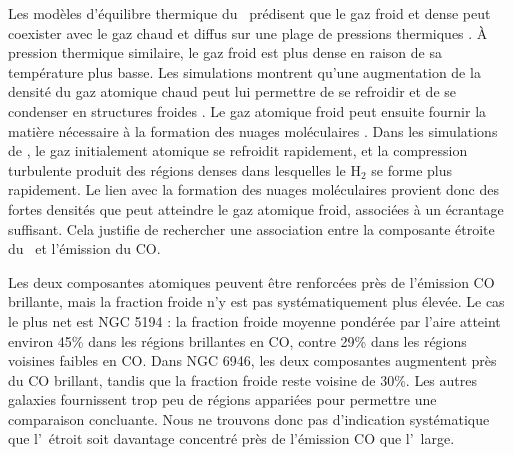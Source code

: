 Les modèles d'équilibre thermique du \HI\ prédisent que le gaz froid et dense peut coexister avec le gaz chaud et diffus sur une plage de pressions thermiques \citep{Wolfire2003}. À pression thermique similaire, le gaz froid est plus dense en raison de sa température plus basse. Les simulations montrent qu'une augmentation de la densité du gaz atomique chaud peut lui permettre de se refroidir et de se condenser en structures froides \citep{Saury2014}. Le gaz atomique froid peut ensuite fournir la matière nécessaire à la formation des nuages moléculaires \citep{Krumholz2009Transition}.
Dans les simulations de \citet{GloverMacLow2007}, le gaz initialement atomique se refroidit rapidement, et la compression turbulente produit des régions denses dans lesquelles le H$_2$ se forme plus rapidement. Le lien avec la formation des nuages moléculaires provient donc des fortes densités que peut atteindre le gaz atomique froid, associées à un écrantage suffisant. Cela justifie de rechercher une association entre la composante étroite du \HI\ et l'émission du CO.

Les deux composantes atomiques peuvent être renforcées près de l'émission CO brillante, mais la fraction froide n'y est pas systématiquement plus élevée. Le cas le plus net est NGC 5194 : la fraction froide moyenne pondérée par l'aire atteint environ 45\% dans les régions brillantes en CO, contre 29\% dans les régions voisines faibles en CO. Dans NGC 6946, les deux composantes augmentent près du CO brillant, tandis que la fraction froide reste voisine de 30\%. Les autres galaxies fournissent trop peu de régions appariées pour permettre une comparaison concluante. Nous ne trouvons donc pas d'indication systématique que l'\HI\ étroit soit davantage concentré près de l'émission CO que l'\HI\ large.

